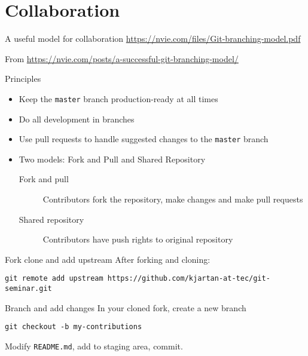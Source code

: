 \documentclass[presentation,aspectratio=1610]{beamer}
\begin{document}
\section{Collaboration}
\label{sec-4}

\begin{frame}[label=sec-4-1]{A useful model for collaboration}
\url{https://nvie.com/files/Git-branching-model.pdf}

From \url{https://nvie.com/posts/a-successful-git-branching-model/}
\end{frame}

\begin{frame}[fragile,label=sec-4-2]{Principles}
 \begin{itemize}
\item Keep the \texttt{master} branch production-ready at \alert{all times}
\item Do all development in branches
\item Use \alert{pull requests} to handle suggested changes to the \texttt{master} branch
\item Two models: \alert{Fork and Pull} and \alert{Shared Repository}
\begin{description}
\item[{Fork and pull}] Contributors fork the repository, make changes and make pull requests
\item[{Shared repository}] Contributors have push rights to original repository
\end{description}
\end{itemize}
\end{frame}

\begin{frame}[fragile,label=sec-4-3]{Fork clone and add upstream}
 After forking and cloning:
\begin{verbatim}
git remote add upstream https://github.com/kjartan-at-tec/git-seminar.git
\end{verbatim}
\end{frame}

\begin{frame}[fragile,label=sec-4-4]{Branch and add changes}
 In your cloned fork, create a new branch
\begin{verbatim}
git checkout -b my-contributions
\end{verbatim}

Modify \texttt{README.md},  add to staging area, commit.
\end{frame}
\end{document}
